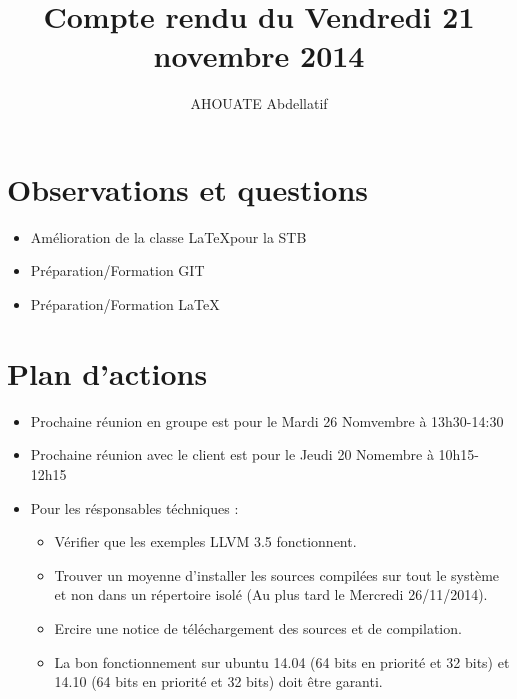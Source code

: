 \documentclass{../../../../../res/rapport}
\author{AHOUATE Abdellatif}
\title{Compte rendu du Vendredi 21 novembre 2014}
\begin{document}
    \maketitle
    \tableofcontents
    \clearpage
    
    \section{Observations et questions} 
    \label{sec:observations_et_questions}
        \begin{itemize}
            
            \item Amélioration de la classe \LaTeX pour la STB
            \item Préparation/Formation GIT
            \item Préparation/Formation \LaTeX
            	 
        \end{itemize}
        
    \section{Plan d'actions} 
    \label{sec:plan_d_actions}
        \begin{itemize}
            \item Prochaine réunion en groupe est pour le Mardi 26 Nomvembre à 13h30-14:30
            \item Prochaine réunion avec le client est pour le Jeudi 20 Nomembre
                  à 10h15-12h15
            \item Pour les résponsables téchniques :
                \begin{itemize}
                  \item Vérifier que les exemples LLVM 3.5 fonctionnent.
                  \item Trouver un moyenne d'installer les sources compilées sur tout le système et non dans un répertoire isolé (Au plus tard le Mercredi 26/11/2014).
                  \item Ercire une notice de téléchargement des sources et de compilation.
                  \item La bon fonctionnement sur ubuntu 14.04 (64 bits en priorité et 32 bits) et 14.10 (64 bits en priorité et 32 bits) doit être garanti.
                \end{itemize}
        \end{itemize}
        
        
\end{document}
